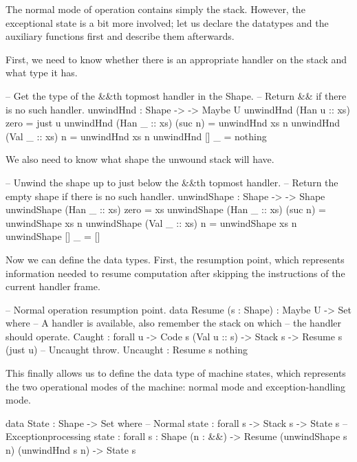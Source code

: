 The normal mode of operation contains simply the stack. However, the exceptional state
is a bit more involved; let us declare the datatypes and the auxiliary functions first
and describe them afterwards.

First, we need to know whether there is an appropriate handler on the stack and what type
it has.
\begin{code}
  -- Get the type of the &&\-th top\-most handler in the Shape.
  -- Return && if there is no such handler.
  unwindHnd : Shape -> \bN -> Maybe U
  unwindHnd (Han u :: xs) zero    = just u
  unwindHnd (Han _ :: xs) (suc n) = unwindHnd xs n
  unwindHnd (Val _ :: xs) n       = unwindHnd xs n
  unwindHnd []           _       = nothing
\end{code}

\noindent We also need to know what shape the unwound stack will have.
\begin{code}
  -- Unwind the shape up to just below the &&\-th top\-most handler.
  -- Return the empty shape if there is no such handler.
  unwindShape : Shape -> \bN -> Shape
  unwindShape (Han _ :: xs) zero    = xs
  unwindShape (Han _ :: xs) (suc n) = unwindShape xs n
  unwindShape (Val _ :: xs) n       = unwindShape xs n
  unwindShape []           _       = []
\end{code}

\noindent Now we can define the data types. First, the resumption point, which
represents information needed to resume computation after skipping the instructions
of the current handler frame.
\begin{code}
  -- Normal operation resumption point.
  data Resume (s : Shape) : Maybe U -> Set where
    -- A handler is available, also remember the stack on which
    -- the handler should operate.
    Caught : forall {u} -> Code s (Val u :: s) -> Stack s -> Resume s (just u)
    -- Uncaught throw.
    Uncaught : Resume s nothing
\end{code}

\noindent This finally allows us to define the data type of machine states, which represents
the two operational modes of the machine: normal mode and exception-handling mode.
\begin{code}
  data State : Shape -> Set where
  	-- Normal state
  	\tick[_] : forall {s} -> Stack s -> State s
  	-- Exception\-processing state
  	\x[_,_] : forall {s : Shape} (n : \bN&\!&)
  	  -> Resume (unwindShape s n) (unwindHnd s n)
  	  -> State s
\end{code}


